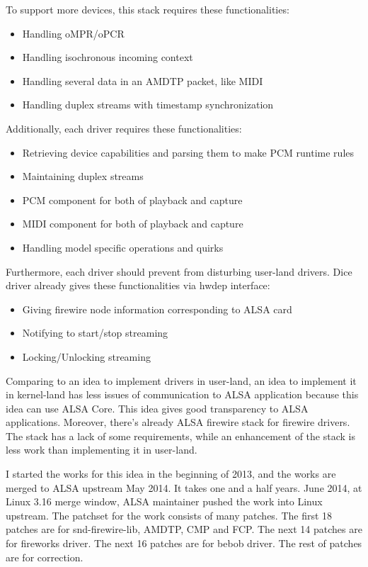 \documentclass[onecolumn]{article}
\begin{document}
To support more devices, this stack requires these functionalities:
\begin{itemize}
\item Handling oMPR/oPCR
\item Handling isochronous incoming context
\item Handling several data in an AMDTP packet, like MIDI
\item Handling duplex streams with timestamp synchronization
\end{itemize}

Additionally, each driver requires these functionalities:
\begin{itemize}
\item Retrieving device capabilities and parsing them to make PCM runtime rules
\item Maintaining duplex streams
\item PCM component for both of playback and capture
\item MIDI component for both of playback and capture
\item Handling model specific operations and quirks
\end{itemize}

Furthermore, each driver should prevent from disturbing user-land drivers. Dice driver already gives these functionalities via hwdep interface:
\begin{itemize}
\item Giving firewire node information corresponding to ALSA card
\item Notifying to start/stop streaming
\item Locking/Unlocking streaming
\end{itemize}

Comparing to an idea to implement drivers in user-land, an idea to implement it in kernel-land has less issues of communication to ALSA application because this idea can use ALSA Core. This idea gives good transparency to ALSA applications. Moreover, there's already ALSA firewire stack for firewire drivers. The stack has a lack of some requirements, while an enhancement of the stack is less work than implementing it in user-land.

I started the works for this idea in the beginning of 2013, and the works are merged to ALSA upstream May 2014. It takes one and a half years. June 2014, at Linux 3.16 merge window, ALSA maintainer pushed the work into Linux upstream. The patchset for the work consists of many patches. The first 18 patches are for snd-firewire-lib, AMDTP, CMP and FCP. The next 14 patches are for fireworks driver. The next 16 patches are for bebob driver. The rest of patches are for correction.
\end{document}
